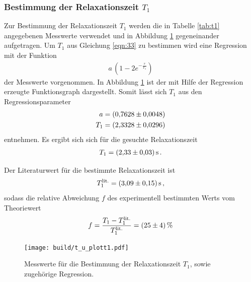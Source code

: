 \subsubsection{Bestimmung der Relaxationszeit $T_{1}$}
\label{subsubsec:T1}
Zur Bestimmung der Relaxationszeit $T_{1}$ werden die in Tabelle \ref{tab:t1} angegebenen
Messwerte verwendet und in Abbildung \ref{fig:T_1bestimmung} gegeneinander aufgetragen.
Um $T_{1}$ aus Gleichung \eqref{eqn:33} zu bestimmen wird eine Regression
mit der Funktion
\begin{align}
  \label{eqn:t1_bestimmung}
  a \, \left( 1 - 2 e^{-\frac{\tau}{T_{1}}} \right)
\end{align}
der Messwerte vorgenommen. In Abbildung \ref{fig:T_1bestimmung} ist
der mit Hilfe der Regression erzeugte Funktionsgraph dargestellt.
Somit lässt sich $T_{1}$ aus den Regressionsparameter
\begin{align*}
  a &= \SI{0.7628+-0.0048}{}\\
  T_{1} &= \SI{2.3328+-0.0296}{}
\end{align*}
entnehmen.
Es ergibt sich sich für die gesuchte Relaxationszeit
\begin{align*}
  T_{1} = \SI{2.33+-0.03}{\second} \, .
\end{align*}


Der Literaturwert\cite{litwerte} für die bestimmte Relaxationszeit ist
\begin{align*}
  T_{1}^\text{lit.} = \SI{3.09+-0.15}{\second} \, ,
\end{align*}
sodass die relative Abweichung $f$ des experimentell bestimmten Werts
vom Theoriewert
\begin{align*}
  f = \frac{T_{1} - T_{1}^\text{lit.}}{T_{1}^\text{lit.}} = \SI{25+-4}{\percent}
\end{align*}


\begin{figure}[hhh]
  \centering
  \texttt{[image: build/t\_u\_plott1.pdf]}
  \caption{Messwerte für die Bestimmung der Relaxationszeit $T_{1}$, sowie zugehörige Regression.}
  \label{fig:T_1bestimmung}
\end{figure}


